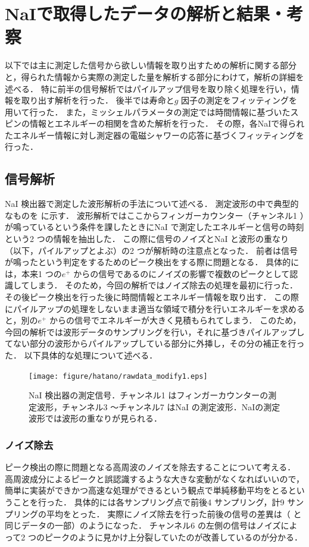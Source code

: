 
%
\section{NaIで取得したデータの解析と結果・考察}
以下では主に測定した信号から欲しい情報を取り出すための解析に関する部分と，得られた情報から実際の測定した量を解析する部分にわけて，解析の詳細を述べる．
特に前半の信号解析ではパイルアップ信号を取り除く処理を行い，情報を取り出す解析を行った．
後半では寿命と$g$ 因子の測定をフィッティングを用いて行った．
また，ミッシェルパラメータの測定では時間情報に基づいたスピンの情報とエネルギーの相関を含めた解析を行った．
その際，各NaIで得られたエネルギー情報に対し測定器の電磁シャワーの応答に基づくフィッティングを行った．

\subsection{信号解析}
NaI 検出器で測定した波形解析の手法について述べる．
測定波形の中で典型的なものを に示す．
波形解析ではここからフィンガーカウンター（チャンネル1 ）が鳴っているという条件を課したときにNaI で測定したエネルギーと信号の時刻という2 つの情報を抽出した．
この際に信号のノイズとNaI と波形の重なり（以下，パイルアップとよぶ）の2 つが解析時の注意点となった．
前者は信号が鳴ったという判定をするためのピーク検出をする際に問題となる．
具体的には，本来1 つの$e^+$ からの信号であるのにノイズの影響で複数のピークとして認識してしまう．
そのため，今回の解析ではノイズ除去の処理を最初に行った．
その後ピーク検出を行った後に時間情報とエネルギー情報を取り出す．
この際にパイルアップの処理をしないまま適当な領域で積分を行いエネルギーを求めると，別の$e^+$ からの信号でエネルギーが大きく見積もられてしまう．
このため，今回の解析では波形データのサンプリングを行い，それに基づきパイルアップしてない部分の波形からパイルアップしている部分に外挿し，その分の補正を行った．
以下具体的な処理について述べる．

\begin{figure}[hbt]
\centering
\texttt{[image: figure/hatano/rawdata\_modify1.eps]}
\caption{NaI 検出器の測定信号．チャンネル1 はフィンガーカウンターの測定波形，チャンネル3 〜チャンネル7 はNaI の測定波形．NaIの測定波形では波形の重なりが見られる．}
\label{hatano_fig:rawdata}
\end{figure}

\subsubsection{ノイズ除去}
ピーク検出の際に問題となる高周波のノイズを除去することについて考える．
高周波成分によるピークと誤認識するような大きな変動がなくなればいいので，簡単に実装ができかつ高速な処理ができるという観点で単純移動平均をとるということを行った．
具体的には各サンプリング点で前後4 サンプリング，計9 サンプリングの平均をとった．
実際にノイズ除去を行った前後の信号の差異は（ と同じデータの一部）のようになった．
チャンネル6 の左側の信号はノイズによって2 つのピークのように見かけ上分裂していたのが改善しているのが分かる．

